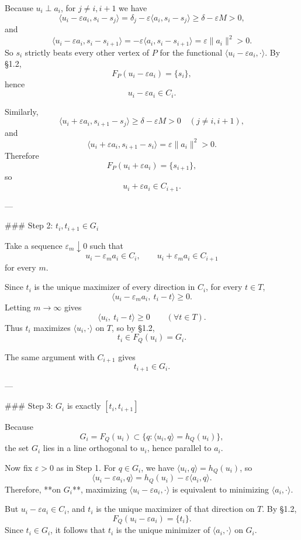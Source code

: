 Because \(u_i\perp a_i\), for \(j\neq i,i+1\) we have
\[
\langle u_i-\varepsilon a_i,s_i-s_j\rangle
=\delta_j-\varepsilon\langle a_i,s_i-s_j\rangle
\ge \delta-\varepsilon M>0,
\]
and
\[
\langle u_i-\varepsilon a_i,s_i-s_{i+1}\rangle
=-\varepsilon\langle a_i,s_i-s_{i+1}\rangle
=\varepsilon\|a_i\|^2>0.
\]
So \(s_i\) strictly beats every other vertex of \(P\) for the functional \(\langle u_i-\varepsilon a_i,\cdot\rangle\). By §1.2,
\[
F_P(u_i-\varepsilon a_i)=\{s_i\},
\]
hence
\[
u_i-\varepsilon a_i\in C_i.
\]

Similarly,
\[
\langle u_i+\varepsilon a_i,s_{i+1}-s_j\rangle\ge \delta-\varepsilon M>0
\quad (j\neq i,i+1),
\]
and
\[
\langle u_i+\varepsilon a_i,s_{i+1}-s_i\rangle
=\varepsilon\|a_i\|^2>0.
\]
Therefore
\[
F_P(u_i+\varepsilon a_i)=\{s_{i+1}\},
\]
so
\[
u_i+\varepsilon a_i\in C_{i+1}.
\]

---

### Step 2: \(t_i,t_{i+1}\in G_i\)

Take a sequence \(\varepsilon_m\downarrow 0\) such that
\[
u_i-\varepsilon_m a_i\in C_i,\qquad u_i+\varepsilon_m a_i\in C_{i+1}
\]
for every \(m\).

Since \(t_i\) is the unique maximizer of every direction in \(C_i\), for every \(t\in T\),
\[
\langle u_i-\varepsilon_m a_i,\ t_i-t\rangle\ge 0.
\]
Letting \(m\to\infty\) gives
\[
\langle u_i,\ t_i-t\rangle\ge 0\qquad(\forall t\in T).
\]
Thus \(t_i\) maximizes \(\langle u_i,\cdot\rangle\) on \(T\), so by §1.2,
\[
t_i\in F_Q(u_i)=G_i.
\]

The same argument with \(C_{i+1}\) gives
\[
t_{i+1}\in G_i.
\]

---

### Step 3: \(G_i\) is exactly \([t_i,t_{i+1}]\)

Because
\[
G_i=F_Q(u_i)\subset \{q:\langle u_i,q\rangle=h_Q(u_i)\},
\]
the set \(G_i\) lies in a line orthogonal to \(u_i\), hence parallel to \(a_i\).

Now fix \(\varepsilon>0\) as in Step 1. For \(q\in G_i\), we have \(\langle u_i,q\rangle=h_Q(u_i)\), so
\[
\langle u_i-\varepsilon a_i,q\rangle=h_Q(u_i)-\varepsilon\langle a_i,q\rangle.
\]
Therefore, **on \(G_i\)**, maximizing \(\langle u_i-\varepsilon a_i,\cdot\rangle\) is equivalent to minimizing \(\langle a_i,\cdot\rangle\).

But \(u_i-\varepsilon a_i\in C_i\), and \(t_i\) is the unique maximizer of that direction on \(T\). By §1.2,
\[
F_Q(u_i-\varepsilon a_i)=\{t_i\}.
\]
Since \(t_i\in G_i\), it follows that \(t_i\) is the unique minimizer of \(\langle a_i,\cdot\rangle\) on \(G_i\).

